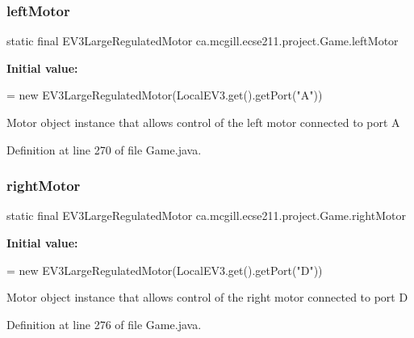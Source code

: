 \subsubsection{\texorpdfstring{left\+Motor}{leftMotor}}
{\footnotesize\ttfamily  static  final E\+V3\+Large\+Regulated\+Motor ca.\+mcgill.\+ecse211.\+project.\+Game.\+left\+Motor\hspace{0.3cm}{\ttfamily [static]}}

{\bfseries Initial value\+:}
\begin{DoxyCode}
=
      \textcolor{keyword}{new} EV3LargeRegulatedMotor(LocalEV3.get().getPort(\textcolor{stringliteral}{"A"}))
\end{DoxyCode}
Motor object instance that allows control of the left motor connected to port A 

Definition at line 270 of file Game.\+java.

\mbox{\label{enumca_1_1mcgill_1_1ecse211_1_1project_1_1_game_a7a05fcf37c4435c32270776a427ba0d2}} 
\subsubsection{\texorpdfstring{right\+Motor}{rightMotor}}
{\footnotesize\ttfamily  static  final E\+V3\+Large\+Regulated\+Motor ca.\+mcgill.\+ecse211.\+project.\+Game.\+right\+Motor\hspace{0.3cm}{\ttfamily [static]}}

{\bfseries Initial value\+:}
\begin{DoxyCode}
=
      \textcolor{keyword}{new} EV3LargeRegulatedMotor(LocalEV3.get().getPort(\textcolor{stringliteral}{"D"}))
\end{DoxyCode}
Motor object instance that allows control of the right motor connected to port D 

Definition at line 276 of file Game.\+java.

\mbox{\label{enumca_1_1mcgill_1_1ecse211_1_1project_1_1_game_ab940d1a52b9759294dc0229e0fd6bc06}} 
